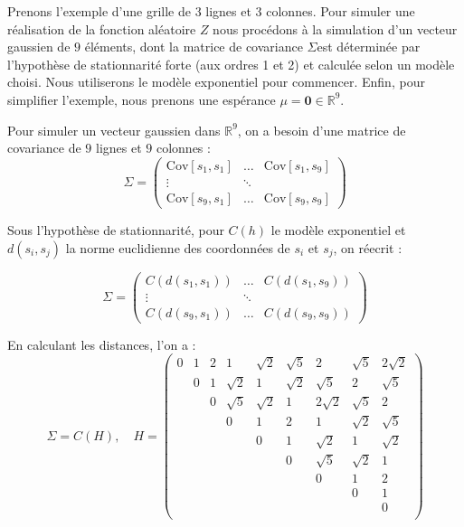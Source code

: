 \documentclass[10pt]{article} %
\begin{document}
Prenons l'exemple d'une grille de $3$ lignes et $3$ colonnes. Pour simuler une réalisation de la fonction aléatoire $Z$ nous procédons à
la simulation d'un vecteur gaussien de $9$ éléments, dont la matrice de covariance $\Sigma$est déterminée par l'hypothèse de stationnarité
forte (aux ordres 1 et 2) et calculée selon un modèle choisi. Nous utiliserons le modèle exponentiel pour commencer. Enfin, pour simplifier
l'exemple, nous prenons une espérance $\mu = \textbf{0} \in \mathbb{R}^9$.

Pour simuler un vecteur gaussien dans $\mathbb{R}^9$, on a besoin d'une matrice de covariance de $9$ lignes et $9$ colonnes :
$$
\Sigma =
\begin{pmatrix}
    \mathrm{Cov}[s_1, s_1] & \dots & \mathrm{Cov}[s_1, s_9] \\
    \vdots & \ddots & \\
    \mathrm{Cov}[s_9, s_1] & \dots & \mathrm{Cov}[s_9, s_9]
\end{pmatrix}
$$

Sous l'hypothèse de stationnarité, pour $C(h)$ le modèle exponentiel et $d(s_i, s_j)$ la norme euclidienne des coordonnées
de $s_i$ et $s_j$, on réecrit :

$$
\Sigma =
\begin{pmatrix}
    C(d(s_1, s_1)) & \dots & C(d(s_1, s_9)) \\
    \vdots & \ddots & \\
    C(d(s_9, s_1)) & \dots & C(d(s_9, s_9))
\end{pmatrix}
$$

En calculant les distances, l'on a :
$$
\Sigma = C(H), \quad H =
\begin{pmatrix}
    0 & 1 & 2 & 1 & \sqrt{2} & \sqrt{5} & 2 & \sqrt{5} & 2\sqrt{2} \\
     & 0 & 1 & \sqrt{2} & 1 & \sqrt{2} & \sqrt{5} & 2 & \sqrt{5} \\
     &  & 0 & \sqrt{5} & \sqrt{2} & 1 & 2\sqrt{2} & \sqrt{5} & 2\\
     & & & 0 & 1 & 2 & 1 & \sqrt{2} & \sqrt{5} \\
     & & & & 0 & 1 & \sqrt{2} & 1 & \sqrt{2} \\
     & & & & & 0 & \sqrt{5} & \sqrt{2} & 1 \\
     & & & & & & 0 & 1 & 2 \\
     & & & & & & & 0 & 1 \\
     & & & & & & & & 0 \\
\end{pmatrix}
$$
\end{document}
